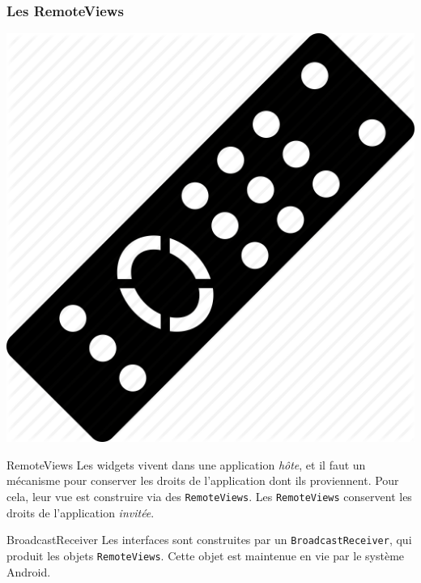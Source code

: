 \documentclass{beamer}
\begin{document}
\begin{frame}
\frametitle{Les RemoteViews}
\begin{center}
\includegraphics[scale=0.05]{remote.png}
\end{center}
\begin{block}{RemoteViews}
Les widgets vivent dans une application \emph{hôte}, et il faut un mécanisme pour conserver les droits de l'application dont ils proviennent. Pour cela, leur vue est construire via des \verb!RemoteViews!. Les \verb!RemoteViews! conservent les droits de l'application \emph{invitée}.
\end{block}

\begin{block}{BroadcastReceiver}
Les interfaces sont construites par un \verb!BroadcastReceiver!, qui produit les objets \verb!RemoteViews!. Cette objet est maintenue en vie par le système Android.
\end{block}
\end{frame}
\end{document}
